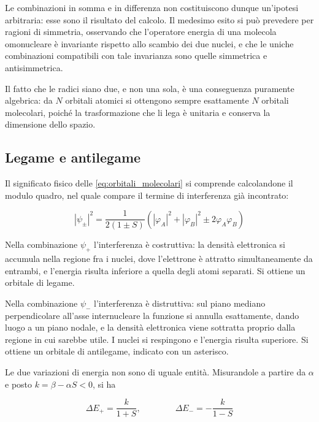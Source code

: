 Le combinazioni in somma e in differenza non costituiscono dunque un'ipotesi arbitraria: esse sono il risultato del calcolo. Il medesimo esito si può prevedere per ragioni di simmetria, osservando che l'operatore energia di una molecola omonucleare è invariante rispetto allo scambio dei due nuclei, e che le uniche combinazioni compatibili con tale invarianza sono quelle simmetrica e antisimmetrica.

Il fatto che le radici siano due, e non una sola, è una conseguenza puramente algebrica: da $N$ orbitali atomici si ottengono sempre esattamente $N$ orbitali molecolari, poiché la trasformazione che li lega è unitaria e conserva la dimensione dello spazio.


\subsection{Legame e antilegame}

Il significato fisico delle \eqref{eq:orbitali_molecolari} si comprende calcolandone il modulo quadro, nel quale compare il termine di interferenza già incontrato:

\begin{equation}
    |\psi_\pm|^2 = \frac{1}{2(1\pm S)}
    \left( |\varphi_A|^2 + |\varphi_B|^2 \pm 2\varphi_A\varphi_B \right)
    \label{eq:densita_mo}
\end{equation}

Nella combinazione $\psi_+$ l'interferenza è costruttiva: la densità elettronica si accumula nella regione fra i nuclei, dove l'elettrone è attratto simultaneamente da entrambi, e l'energia risulta inferiore a quella degli atomi separati. Si ottiene un orbitale di legame.

Nella combinazione $\psi_-$ l'interferenza è distruttiva: sul piano mediano perpendicolare all'asse internucleare la funzione si annulla esattamente, dando luogo a un piano nodale, e la densità elettronica viene sottratta proprio dalla regione in cui sarebbe utile. I nuclei si respingono e l'energia risulta superiore. Si ottiene un orbitale di antilegame, indicato con un asterisco.

Le due variazioni di energia non sono di uguale entità. Misurandole a partire da $\alpha$ e posto $k = \beta - \alpha S < 0$, si ha

\begin{equation*}
    \Delta E_+ = \frac{k}{1+S}, \qquad\qquad \Delta E_- = -\frac{k}{1-S}
\end{equation*}

